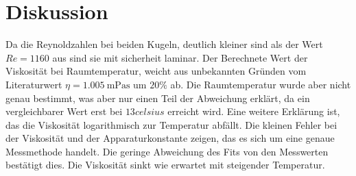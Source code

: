 \section{Diskussion}
\label{sec:Diskussion}
Da die Reynoldzahlen bei beiden Kugeln, deutlich kleiner sind als der
Wert $Re=1160$ aus \cite{gertzen} sind sie mit sicherheit laminar.
Der Berechnete Wert der Viskosität bei Raumtemperatur,
weicht aus unbekannten Gründen vom Literaturwert $\eta=\SI{1.005}{\meter\pascal\second}$\cite{gertzen}
 um $20\%$ ab.
Die Raumtemperatur wurde aber nicht genau bestimmt, was aber nur einen Teil der
Abweichung erklärt, da ein vergleichbarer Wert erst bei $13\si{celsius}$ erreicht wird.
Eine weitere Erklärung ist, das die Viskosität logarithmisch zur Temperatur abfällt.
Die kleinen Fehler bei der Viskosität und der Apparaturkonstante zeigen, das
es sich um eine genaue Messmethode handelt. Die geringe Abweichung des Fits von
den Messwerten bestätigt dies. Die Viskosität sinkt wie erwartet mit steigender
Temperatur.
